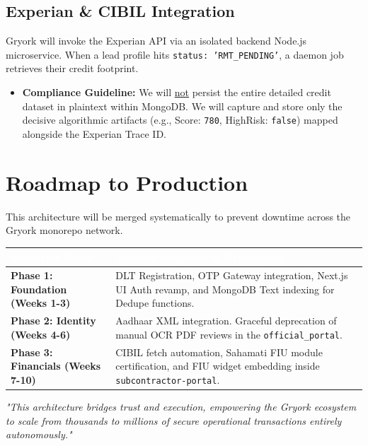 \documentclass[11pt, a4paper]{report}
\begin{document}
\section{Experian \& CIBIL Integration}
Gryork will invoke the Experian API via an isolated backend Node.js microservice. When a lead profile hits \texttt{status: 'RMT\_PENDING'}, a daemon job retrieves their credit footprint.

\begin{itemize}[itemsep=0.3em]
    \item \textbf{Compliance Guideline:} We will \underline{not} persist the entire detailed credit dataset in plaintext within MongoDB. We will capture and store only the decisive algorithmic artifacts (e.g., Score: \texttt{780}, HighRisk: \texttt{false}) mapped alongside the Experian Trace ID.
\end{itemize}

\chapter{Roadmap to Production}
This architecture will be merged systematically to prevent downtime across the Gryork monorepo network.

\begin{center}
\renewcommand{\arraystretch}{1.5}
\begin{tabularx}{\textwidth}{|>{\columncolor{gryorkBlue!10}\bfseries}l|X|}
\hline
\rowcolor{gryorkBlue}
\textcolor{white}{\textbf{Execution Phase}} & \textcolor{white}{\textbf{Primary Engineering Deliverables}} \\
\hline
Phase 1: Foundation (Weeks 1-3) & DLT Registration, OTP Gateway integration, Next.js UI Auth revamp, and MongoDB Text indexing for Dedupe functions. \\
\hline
Phase 2: Identity (Weeks 4-6) & Aadhaar XML integration. Graceful deprecation of manual OCR PDF reviews in the \texttt{official\_portal}. \\
\hline
Phase 3: Financials (Weeks 7-10) & CIBIL fetch automation, Sahamati FIU module certification, and FIU widget embedding inside \texttt{subcontractor-portal}. \\
\hline
\end{tabularx}
\end{center}

\vspace{1.5cm}
\begin{center}
\large\textit{"This architecture bridges trust and execution, empowering the Gryork ecosystem to scale from thousands to millions of secure operational transactions entirely autonomously."}
\end{center}
\end{document}
